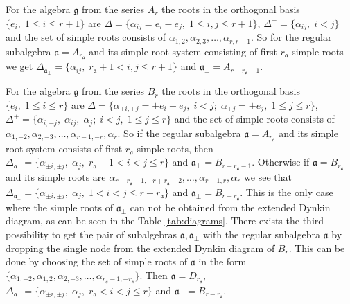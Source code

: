 \documentclass[a4paper,12pt]{article}
\theoremstyle{definition} \newtheorem{Def}{Definition}
\begin{document}
For the algebra $\mathfrak{g}$ from the series $A_r$ the roots in the orthogonal basis $\{e_i,\; 1\leq i\leq r+1\}$ are $\Delta=\{\alpha_{ i j}= e_i- e_j,\; 1\leq i, j\leq r+1\}$, $\Delta^{+}=\{\alpha_{ij},\; i<j\}$ and the set of simple roots consists of $\alpha_{1,2},\alpha_{2,3},\dots,\alpha_{r,r+1}$. So for the regular subalgebra $\mathfrak{a}=A_{r_{\mathfrak{a}}}$ and its simple root system consisting of first $r_{\mathfrak{a}}$ simple roots we get $\Delta_{\mathfrak{a}_{\bot}}=\{\alpha_{ i j},\; r_{\mathfrak{a}}+1<i,j\leq r+1\}$ and $\mathfrak{a}_{\bot}=A_{r-r_{\mathfrak{a}}-1}$.

For the algebra $\mathfrak{g}$ from the series $B_r$ the roots in the orthogonal basis $\{e_i,\; 1\leq i\leq r\}$ are $\Delta=\{\alpha_{\pm i,\pm j}=\pm e_i\pm e_j,\;i<j;\; \alpha_{\pm j}=\pm e_{ j},\; 1\leq j\leq r\}$, $\Delta^{+}=\{\alpha_{i,-j},\; \alpha_{ij},\; \alpha_j;\; i<j,\; 1\leq j\leq r\}$ and the set of simple roots consists of $\alpha_{1,-2},\alpha_{2,-3},\dots,\alpha_{r-1,-r},\alpha_r$. So if the regular subalgebra $\mathfrak{a}=A_{r_{\mathfrak{a}}}$ and its simple root system consists of first $r_{\mathfrak{a}}$ simple roots, then $\Delta_{\mathfrak{a}_{\bot}}=\{\alpha_{\pm i,\pm j},\;\alpha_j,\; r_{\mathfrak{a}}+1<i<j\leq r\}$ and $\mathfrak{a}_{\bot}=B_{r-r_{\mathfrak{a}}-1}$. Otherwise if $\mathfrak{a}=B_{r_{\mathfrak{a}}}$ and its simple roots are $\alpha_{r-r_{\mathfrak{a}}+1,-r+r_{\mathfrak{a}}-2},\dots,\alpha_{r-1,r},\alpha_r$ we see that $\Delta_{\mathfrak{a}_{\bot}}=\{\alpha_{\pm i,\pm j},\;\alpha_j,\; 1<i<j\leq r-r_{\mathfrak{a}}\}$ and $\mathfrak{a}_{\bot}=B_{r-r_{\mathfrak{a}}}$. This is the only case where the simple roots of $\mathfrak{a}_{\bot}$ can not be obtained from the extended Dynkin diagram, as can be seen in the Table \ref{tab:diagrams}.
There exists the third possibility to get the pair of subalgebras $\mathfrak{a},\mathfrak{a}_{\bot}$ with the regular subalgebra $\mathfrak{a}$ by dropping the single node from the extended Dynkin diagram of $B_r$. This can be done by choosing the set of simple roots of $\mathfrak{a}$ in the form $\{\alpha_{1,-2},\alpha_{1,2},\alpha_{2,-3},\dots,\alpha_{r_{\mathfrak{a}}-1,-r_{\mathfrak{a}}}\}$. Then $\mathfrak{a}=D_{r_{\mathfrak{a}}}$, $\Delta_{\mathfrak{a}_{\bot}}=\{\alpha_{\pm i,\pm j},\;\alpha_j,\; r_{\mathfrak{a}}<i<j\leq r\}$ and $\mathfrak{a}_{\bot}=B_{r-r_{\mathfrak{a}}}$.
\end{document}

